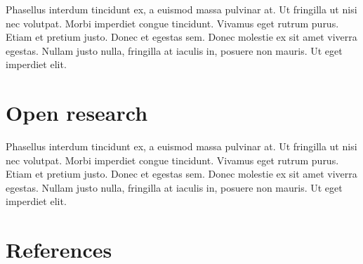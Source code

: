 \documentclass[
  number,
  preprint,
  3p,
  onecolumn]{elsarticle}
\begin{document}
Phasellus interdum tincidunt ex, a euismod massa pulvinar at. Ut
fringilla ut nisi nec volutpat. Morbi imperdiet congue tincidunt.
Vivamus eget rutrum purus. Etiam et pretium justo. Donec et egestas sem.
Donec molestie ex sit amet viverra egestas. Nullam justo nulla,
fringilla at iaculis in, posuere non mauris. Ut eget imperdiet elit.

\section{Open research}\label{open-research}

Phasellus interdum tincidunt ex, a euismod massa pulvinar at. Ut
fringilla ut nisi nec volutpat. Morbi imperdiet congue tincidunt.
Vivamus eget rutrum purus. Etiam et pretium justo. Donec et egestas sem.
Donec molestie ex sit amet viverra egestas. Nullam justo nulla,
fringilla at iaculis in, posuere non mauris. Ut eget imperdiet elit.

\section*{References}\label{references}

\renewcommand{\bibsection}{}

\end{document}
